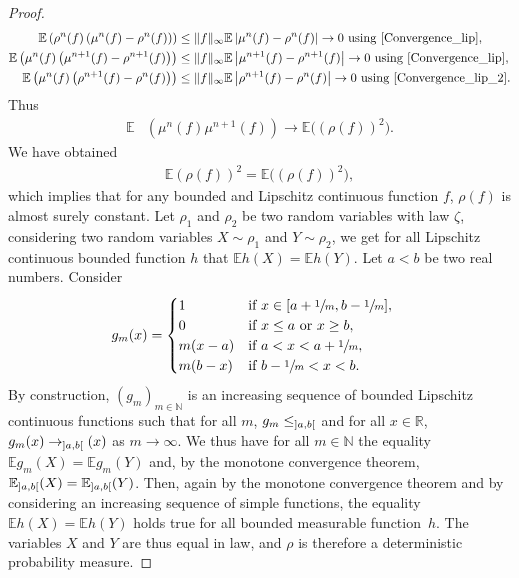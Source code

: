 \documentclass[11pt]{article}
\makeatletter
\DeclareRobustCommand{\mathbbm}[1]{\csname jepbb@#1\endcsname}
\let\mathds\mathbbm
\theoremstyle{plain}
\theoremstyle{definition}
\makeatother
\begin{document}
\begin{proof}
\begin{align*}
\mathbb{E}\left(\rho^n(f)\left(\mu^n(f)-\rho^n(f)\right)\right)&\leq \|f\|_{\infty}\mathbb{E}\left|\mu^n(f)-\rho^n(f)\right|\to0\text{ using \eqref{Convergence_lip}},\\
\mathbb{E}\left(\mu^n(f)\left(\mu^{n+1}(f)-\rho^{n+1}(f)\right)\right)&\leq \|f\|_{\infty}\mathbb{E}\left|\mu^{n+1}(f)-\rho^{n+1}(f)\right|\to0\text{ using \eqref{Convergence_lip}},\\
\mathbb{E}\left(\mu^n(f)\left(\rho^{n+1}(f)-\rho^{n}(f)\right)\right)&\leq \|f\|_{\infty}\mathbb{E}\left|\rho^{n+1}(f)-\rho^{n}(f)\right|\to0\text{ using \eqref{Convergence_lip_2}}.
\end{align*}
Thus
\begin{align*}
\mathbb{E}&\left(\mu^{n}(f)\mu^{n+1}(f)\right)\to\mathbb{E}\bigl(\left(\rho(f)\right)^2\bigr).
\end{align*}
We have obtained
\begin{align*}
\mathbb{E}\left(\rho(f)\right)^2=\mathbb{E}\bigl(\left(\rho(f)\right)^2\bigr),
\end{align*}
which implies that for any bounded and Lipschitz continuous function $f$, $\rho(f)$ is almost surely constant. Let $\rho_1$ and $\rho_2$ be two random variables with law $\zeta$, considering two random variables $X\sim\rho_1$ and $Y\sim\rho_2$, we get for all Lipschitz continuous bounded function $h$ that $\mathbb{E}h(X)=\mathbb{E}h(Y)$. Let $a<b$ be two real numbers. Consider
\begin{align*}
g_m(x)&=\begin{cases}
1 &\text{if }x\in[a+\sfrac{1}{m},b-\sfrac{1}{m}],\\
0 &\text{if }x\leq a\text{ or }x\geq b,\\
m(x-a)&\text{if }a<x<a+\sfrac{1}{m},\\
m(b-x)&\text{if }b-\sfrac{1}{m}<x<b.
\end{cases}
\end{align*}
By construction, $(g_m)_{m\in\mathbb{N}}$ is an increasing sequence of bounded Lipschitz continuous functions such that for all $m$, $g_m\leq\mathds{1}_{]a,b[}$ and for all $x\in\mathbb{R}$, $g_m(x)\to\mathds{1}_{]a,b[}(x)$ as $m\to\infty$. We thus have for all $m\in\mathbb{N}$ the equality $\mathbb{E}g_m(X)=\mathbb{E}g_m(Y)$ and, by the monotone convergence theorem, $\mathbb{E}\mathds{1}_{]a,b[}(X)=\mathbb{E}\mathds{1}_{]a,b[}(Y)$. Then, again by the monotone convergence theorem and by considering an increasing sequence of simple functions, the equality $\mathbb{E}h(X)=\mathbb{E}h(Y)$ holds true for all bounded measurable function~$h$. The variables $X$ and $Y$ are thus equal in law, and $\rho$ is therefore a deterministic probability measure.
\end{proof}
\end{document}
